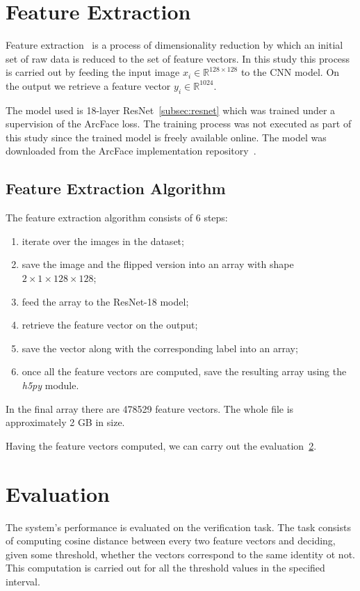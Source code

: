 \section{Feature Extraction}\label{sec:feature-extraction}
Feature extraction~\cite{FeEx} is a process of dimensionality reduction by which an initial set of raw data
is reduced to the set of feature vectors.
In this study this process is carried out by feeding the input image $x_i \in \mathbb{R}^{128\times128 }$ to the CNN model.
On the output we retrieve a feature vector $y_i \in \mathbb{R}^{1024}$.

The model used is 18-layer ResNet~\ref{subsec:resnet} which was trained under a supervision of the ArcFace loss.
The training process was not executed as part of this study since the trained model is freely available online.
The model was downloaded from the ArcFace implementation repository~\cite{ArcFacePyTorch}.

\subsection{Feature Extraction Algorithm}\label{subsec:feexalgo}
The feature extraction algorithm consists of 6 steps:
\begin{enumerate}
    \item iterate over the images in the dataset;
    \item save the image and the flipped version into an array with shape $2\times1\times128\times128$;
    \item feed the array to the ResNet-18 model;
    \item retrieve the feature vector on the output;
    \item save the vector along with the corresponding label into an array;
    \item once all the feature vectors are computed, save the resulting array using the \textit{h5py} module.
\end{enumerate}

In the final array there are 478529 feature vectors.
The whole file is approximately 2 GB in size.

Having the feature vectors computed, we can carry out the evaluation~\ref{sec:evaluation}.

\section{Evaluation}\label{sec:evaluation}
The system's performance is evaluated on the verification task.
The task consists of computing cosine distance between every two feature
vectors and deciding, given some threshold, whether the vectors correspond to the same identity ot not.
This computation is carried out for all the threshold values in the specified interval.

